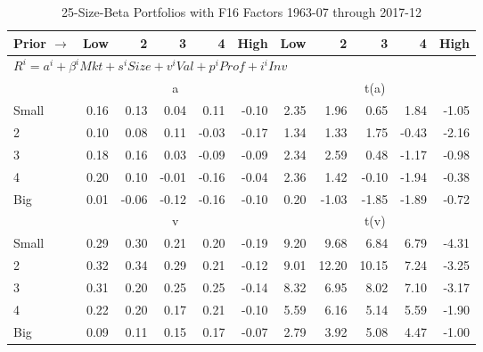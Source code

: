 
\begin{table}[!ht]
\footnotesize
\centering
\caption{25-Size-Beta Portfolios with F16 Factors 1963-07 through 2017-12}
\begin{tabular}{lrrrrrrrrrr}
  \toprule
    Prior $\rightarrow$ & Low & 2 & 3 & 4 & High & Low & 2 & 3 & 4 & High \\ 
  \midrule
  \multicolumn{11}{l}{$R^i=a^i+\beta^iMkt+s^iSize+v^iVal+p^iProf+i^iInv$} \\

  
    
      & \multicolumn{5}{c}{a} & \multicolumn{5}{c}{t(a)}
    
    \\
      \cmidrule(r){2-6} \cmidrule(r){7-11}

    Small   & 0.16  & 0.13  & 0.04  & 0.11  & -0.10  & 2.35  & 1.96  & 0.65  & 1.84  & -1.05  \\
         2  & 0.10  & 0.08  & 0.11  & -0.03  & -0.17  & 1.34  & 1.33  & 1.75  & -0.43  & -2.16  \\
         3  & 0.18  & 0.16  & 0.03  & -0.09  & -0.09  & 2.34  & 2.59  & 0.48  & -1.17  & -0.98  \\
         4  & 0.20  & 0.10  & -0.01  & -0.16  & -0.04  & 2.36  & 1.42  & -0.10  & -1.94  & -0.38  \\
    Big     & 0.01  & -0.06  & -0.12  & -0.16  & -0.10  & 0.20  & -1.03  & -1.85  & -1.89  & -0.72  \\

  
    
      & \multicolumn{5}{c}{v} & \multicolumn{5}{c}{t(v)}
    
    \\
      \cmidrule(r){2-6} \cmidrule(r){7-11}

    Small   & 0.29  & 0.30  & 0.21  & 0.20  & -0.19  & 9.20  & 9.68  & 6.84  & 6.79  & -4.31  \\
         2  & 0.32  & 0.34  & 0.29  & 0.21  & -0.12  & 9.01  & 12.20  & 10.15  & 7.24  & -3.25  \\
         3  & 0.31  & 0.20  & 0.25  & 0.25  & -0.14  & 8.32  & 6.95  & 8.02  & 7.10  & -3.17  \\
         4  & 0.22  & 0.20  & 0.17  & 0.21  & -0.10  & 5.59  & 6.16  & 5.14  & 5.59  & -1.90  \\
    Big     & 0.09  & 0.11  & 0.15  & 0.17  & -0.07  & 2.79  & 3.92  & 5.08  & 4.47  & -1.00  \\

  
    

\end{tabular}
\end{table}
